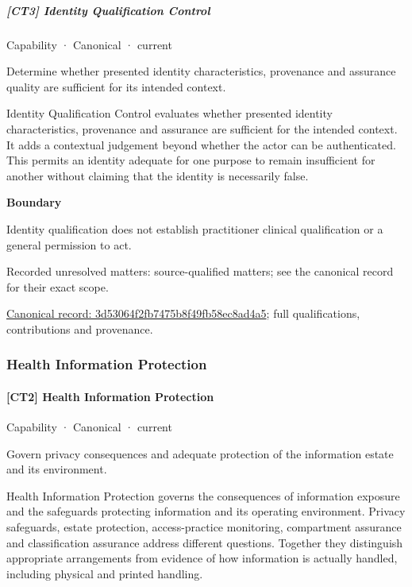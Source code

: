 \subparagraph{[CT3] Identity Qualification Control}

\label{element:3d53064f2fb7475b8f49fb58ec8ad4a5}
{\small Capability · Canonical · current}\par

Determine whether presented identity characteristics, provenance and assurance quality are sufficient for its intended context.



Identity Qualification Control evaluates whether presented identity characteristics, provenance and assurance are sufficient for the intended context. It adds a contextual judgement beyond whether the actor can be authenticated. This permits an identity adequate for one purpose to remain insufficient for another without claiming that the identity is necessarily false.



\textbf{Boundary}



Identity qualification does not establish practitioner clinical qualification or a general permission to act.


{\small Recorded unresolved matters: source-qualified matters; see the canonical record for their exact scope.}\par
{\footnotesize \href{../../../../continuum/strategy/capability/3d53064f2fb7475b8f49fb58ec8ad4a5.md}{Canonical record: 3d53064f2fb7475b8f49fb58ec8ad4a5}; full qualifications, contributions and provenance.}\par
\subsubsection{Health Information Protection}

\paragraph{[CT2] Health Information Protection}

\label{element:4ae0de8fa16840d09ab2ef3f5545a5e7}
{\small Capability · Canonical · current}\par

Govern privacy consequences and adequate protection of the information estate and its environment.



Health Information Protection governs the consequences of information exposure and the safeguards protecting information and its operating environment. Privacy safeguards, estate protection, access-practice monitoring, compartment assurance and classification assurance address different questions. Together they distinguish appropriate arrangements from evidence of how information is actually handled, including physical and printed handling.



